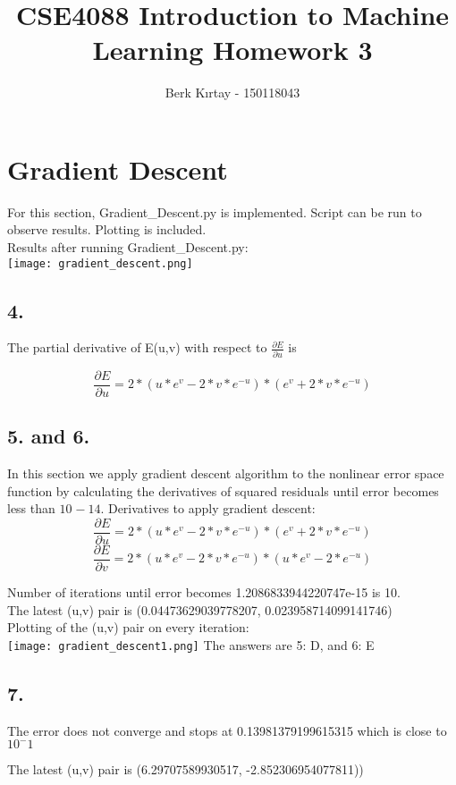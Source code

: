\documentclass{homework}
\title
{
CSE4088 Introduction to Machine Learning 
Homework 3
}
\date{}
\author{Berk Kırtay - 150118043}
\begin{document}
\maketitle

\section*{Gradient Descent}
For this section, Gradient_Descent.py is implemented. Script can be run to observe results. Plotting is included.\\
Results after running Gradient_Descent.py:\\
\texttt{[image: gradient\_descent.png]}

\subsection*{4.}
The partial derivative of E(u,v) with respect to \(\frac{\partial E}{\partial u}\) is

\[ \frac{\partial E}{\partial u} = 2*(u*e^v - 2*v*e^{-u}) * (e^v + 2*v*e^{-u})\]
\subsection*{5. and 6.}
In this section we apply gradient descent algorithm to the nonlinear error space function by 
calculating the derivatives of squared residuals until error becomes less than \(10^{}-14\).
Derivatives to apply gradient descent:
\[ \frac{\partial E}{\partial u} = 2*(u*e^v - 2*v*e^{-u}) * (e^v + 2*v*e^{-u})\]
\[ \frac{\partial E}{\partial v} = 2*(u*e^v - 2*v*e^{-u}) * (u*e^v - 2*e^{-u})\]

Number of iterations until error becomes 1.2086833944220747e-15
is 10.\\
The latest (u,v) pair is (0.04473629039778207, 0.023958714099141746)\\

Plotting of the (u,v) pair on every iteration:\\
\texttt{[image: gradient\_descent1.png]}
The answers are 5: D, and 6: E

\subsection*{7.}
The error does not converge and stops at 0.13981379199615315 which is close to \(10^-1\)

The latest (u,v) pair is (6.29707589930517, -2.852306954077811))\\
\end{document}
